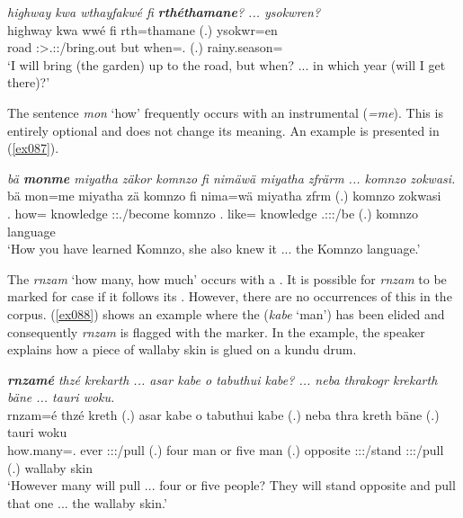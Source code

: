 \begin{exe}
	\ex \emph{highway kwa wthayfakwé fi \textbf{rthéthamane}? ... ysokwren?}\\
	\gll highway kwa wwé fi rth=thamane (.) ysokwr=en\\
	road \Fut{} \Fsg:\Sbj>\Tsg.\F:\Nonpast:\Ipfv/bring.out but when=\Temp{}.\Poss{} (.) rainy.season=\Loc{}\\
	\trans `I will bring (the garden) up to the road, but when? ... in which year (will I get there)?'
	\label{ex086}
\end{exe}%

The sentence  \emph{mon} `how' frequently occurs with an instrumental  (\emph{=me}). This is entirely optional and does not change its meaning. An example is presented in (\ref{ex087}).

\begin{exe}
	\ex \emph{bä \textbf{monme} miyatha zäkor komnzo fi nimäwä miyatha zfrärm ... komnzo zokwasi.}\\
	\gll bä mon=me miyatha zä komnzo fi nima=wä miyatha zfrm (.) komnzo zokwasi\\
	\Ssg{}.\Abs{} how=\Ins{} knowledge \Stsg:\Sbj:\Rpst.\Pfv/become komnzo \Third{}.\Abs{} like=\Emph{} knowledge \Tsg{}.\F{}:\Sbj:\Pst{}:\Dur{}/be (.) komnzo language\\
	\trans `How you have learned Komnzo, she also knew it ... the Komnzo language.'
	\label{ex087}
\end{exe}%

The   \emph{rnzam} `how many, how much' occurs with a  . It is possible for \emph{rnzam} to be marked for case if it follows its . However, there are no occurrences of this in the corpus. (\ref{ex088}) shows an example where the   (\emph{kabe} `man') has been elided and consequently \emph{rnzam} is flagged with the   marker. In the example, the speaker explains how a piece of wallaby skin is glued on a kundu drum.

\begin{exe}
	\ex \emph{\textbf{rnzamé} thzé krekarth ... asar kabe o tabuthui kabe? ... neba thrakogr krekarth bäne ... tauri woku.}\\
	\gll rnzam=é thzé kreth (.) asar kabe o tabuthui kabe (.) neba thra kreth bäne (.) tauri woku\\
	how.many=\Erg.\Nsg{} ever \Stpl:\Sbj:\Irr:\Pfv/pull (.) four man or five man (.) opposite \Stpl:\Sbj:\Irr:\Stat/stand \Stpl:\Sbj:\Irr:\Pfv/pull \Recog{} (.) wallaby skin\\
	\trans `However many will pull ... four or five people? They will stand opposite and pull that one ... the wallaby skin.'
	\label{ex088}
\end{exe}%

